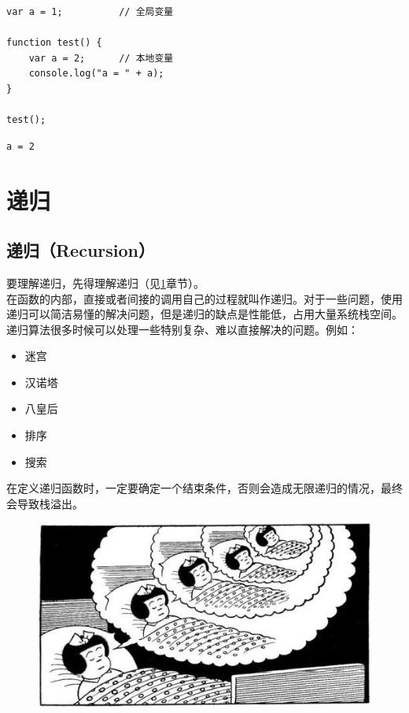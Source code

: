 \begin{lstlisting}[style=htmlcssjs]
var a = 1;          // 全局变量

function test() {
    var a = 2;      // 本地变量
    console.log("a = " + a);
}

test();
\end{lstlisting}

\begin{tcolorbox}
	\begin{verbatim}
a = 2
	\end{verbatim}
\end{tcolorbox}

\newpage

\section{递归} \label{recursive}

\subsection{递归（Recursion）}

要理解递归，先得理解递归（见\ref{recursive}章节）。\\

在函数的内部，直接或者间接的调用自己的过程就叫作递归。对于一些问题，使用递归可以简洁易懂的解决问题，但是递归的缺点是性能低，占用大量系统栈空间。\\

递归算法很多时候可以处理一些特别复杂、难以直接解决的问题。例如：

\begin{itemize}
	\item 迷宫
	\item 汉诺塔
	\item 八皇后
	\item 排序
	\item 搜索
\end{itemize}

在定义递归函数时，一定要确定一个结束条件，否则会造成无限递归的情况，最终会导致栈溢出。

\begin{figure}[H]
	\centering
	\includegraphics[scale=0.7]{img/C13/13-3/1.png}
\end{figure}

